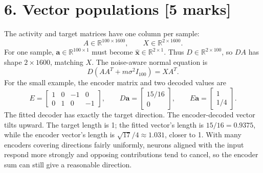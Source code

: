 \documentclass[10pt,letterpaper]{article}
\newcommand{\vct}[1]{\boldsymbol{#1}}
\begin{document}
\section*{6. Vector populations [5 marks]}
The activity and target matrices have one column per sample:
\[
A\in\mathbb R^{100\times1600},\qquad X\in\mathbb R^{2\times1600}.
\]
For one sample, \(\vct{a}\in\mathbb R^{100\times1}\) must become \(\hat{\vct{x}}\in\mathbb R^{2\times1}\). Thus \(\boxed{D\in\mathbb R^{2\times100}}\), so \(DA\) has shape \(2\times1600\), matching \(X\). The noise-aware normal equation is
\[
\boxed{D(AA^T+m\sigma^2I_{100})=XA^T}.
\]
For the small example, the encoder matrix and two decoded values are
\[
E=\begin{bmatrix}1&0&-1&0\\0&1&0&-1\end{bmatrix},\qquad
D\vct{a}=\begin{bmatrix}15/16\\0\end{bmatrix},\qquad
E\vct{a}=\begin{bmatrix}1\\1/4\end{bmatrix}.
\]
The fitted decoder has exactly the target direction. The encoder-decoded vector tilts upward. The target length is 1; the fitted vector's length is \(15/16=0.9375\), while the encoder vector's length is \(\sqrt{17}/4\approx1.031\), closer to 1. With many encoders covering directions fairly uniformly, neurons aligned with the input respond more strongly and opposing contributions tend to cancel, so the encoder sum can still give a reasonable direction.
\end{document}
